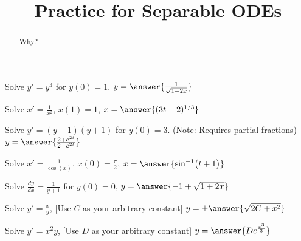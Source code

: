 \documentclass{ximera}
\title{Practice for Separable ODEs}
\begin{document}
\begin{abstract}
    Why?
\end{abstract}
\maketitle


\begin{exercise}
    Solve $y' = y^3$ for $y(0)=1$. $y = \answer{\frac{1}{\sqrt{1-2x}}}$
\end{exercise}

\begin{exercise}%
    Solve $x' = \frac{1}{x^2}$, $x(1)=1$, $x = \answer{(3t-2)^{1/3}}$
\end{exercise}


\begin{exercise}
    Solve $y' = (y-1)(y+1)$ for $y(0)=3$. (Note: Requires partial fractions) $y = \answer{\frac{2 + e^{2t}}{2 - e^{2t}}}$
\end{exercise}

\begin{exercise}%
    Solve $x' = \frac{1}{\cos(x)}$, $x(0)=\frac{\pi}{2}$, $x = \answer{\sin^{-1} \bigl(t+1\bigr)}$
\end{exercise}


\begin{exercise}
    Solve $\frac{dy}{dx} = \frac{1}{y+1}$ for $y(0)=0$, $y = \answer{-1 + \sqrt{1+2x}}$
\end{exercise}

\begin{exercise}
    Solve $y' = \frac{x}{y}$, [Use $C$ as your arbitrary constant] $y = \pm \answer{\sqrt{2C + x^2}}$
\end{exercise}

\begin{exercise}
    Solve $y' = x^2y$, [Use $D$ as your arbitrary constant] $y = \answer{De^{\frac{x^3}{3}}}$
\end{exercise}
\end{document}

